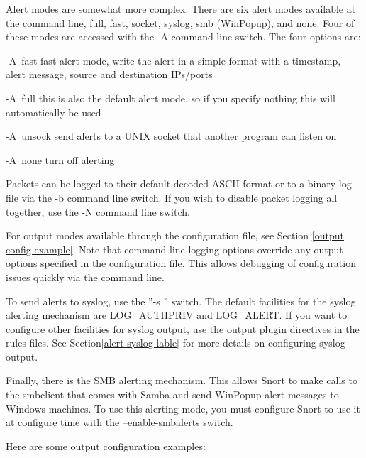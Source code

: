 \documentclass[english]{report}
\begin{document}
Alert modes are somewhat more complex. There are six alert modes available
at the command line, full, fast, socket, syslog, smb (WinPopup), and
none. Four of these modes are accessed with the -A command line switch.
The four options are:

\begin{list}{}
\item [-A~fast]fast alert mode, write the alert in a simple format with
a timestamp, alert message, source and destination IPs/ports
\item [-A~full]this is also the default alert mode, so if you specify
nothing this will automatically be used 
\item [-A~unsock]send alerts to a UNIX socket that another program can
listen on 
\item [-A~none]turn off alerting
\end{list}
Packets can be logged to their default decoded ASCII format or to
a binary log file via the -b command line switch. If you wish to disable
packet logging all together, use the -N command line switch.

For output modes available through the configuration file, see Section
\ref{output config example}. Note that command line logging options
override any output options specified in the configuration file. This
allows debugging of configuration issues quickly via the command line.

To send alerts to syslog, use the ''-s '' switch. The default facilities
for the syslog alerting mechanism are LOG\_AUTHPRIV and LOG\_ALERT.
If you want to configure other facilities for syslog output, use the
output plugin directives in the rules files. See Section\ref{alert syslog lable}
for more details on configuring syslog output.

Finally, there is the SMB alerting mechanism. This allows Snort to
make calls to the smbclient that comes with Samba and send WinPopup
alert messages to Windows machines. To use this alerting mode, you
must configure Snort to use it at configure time with the --enable-smbalerts
switch. 

Here are some output configuration examples:
\end{document}
